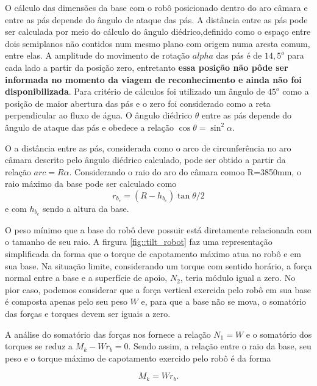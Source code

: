 O cálculo das dimensões da base com o robô posicionado dentro do aro câmara e
entre as pás depende do
ângulo de ataque das pás. A distância entre as pás pode ser calculada por meio
do cálculo do ângulo diédrico,definido como o espaço entre dois semiplanos não contidos num mesmo
plano com origem numa aresta comum, entre elas. A amplitude do movimento de
rotação $alpha$ das pás é de $14,5^o$ para cada lado a partir da posição zero,
entretanto \textbf{essa posição não pôde ser informada no momento da viagem de
reconhecimento e ainda não foi disponibilizada}. Para critério de cálculos foi
utilizado um ângulo de $45^o$ como a posição de maior abertura das pás e o zero
foi considerado como a reta perpendicular ao fluxo de água. O ângulo diédrico
$\theta$ entre as pás depende do ângulo de ataque das pás e obedece a relação
$\cos{\theta} = \sin^2{\alpha}.$

O a distância entre as pás, considerada como o arco de circunferência no aro
câmara descrito pelo ângulo diédrico calculado, pode ser obtido a partir da
relação $arc=R\alpha$.
Considerando o raio do aro do câmara comoo R=3850mm, o raio máximo da base pode
ser calculado como $$r_{b_e} = (R - h_{b_e})\tan{\theta/2}$$ e com $h_{b_e}$
sendo a altura da base.

O peso mínimo que a base do robô deve possuir está diretamente relacionada com o
tamanho de seu raio. A firgura \ref{fig::tilt_robot} faz uma representação
simplificada da forma que o torque de capotamento máximo atua no robô e em sua
base. Na situação limite, considerando um torque com sentido horário, a força
normal entre a base e a superfície de apoio, $N_2$, teria módulo igual a zero.
No pior caso, podemos considerar que a força vertical exercida pelo robô em sua
base é composta apenas pelo seu peso $W$ e, para que a base não se mova, o
somatório das forças e torques devem ser iguais a zero.

A análise do somatório das forças nos fornece a relação $N_1=W$  e o somatório
dos torques se reduz a $M_k-Wr_b=0$. Sendo assim, a relação entre o raio da base, seu 
peso e o torque máximo de capotamento exercido pelo robô é
da forma 

$$M_k=Wr_b.$$

